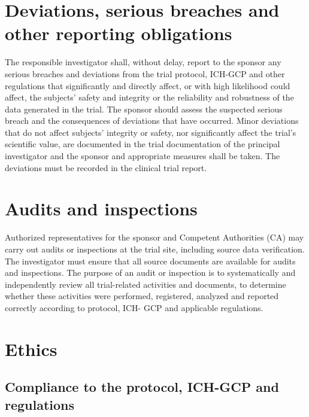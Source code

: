 \documentclass[
]{scrartcl}
\begin{document}
\hypertarget{deviations-serious-breaches-and-other-reporting-obligations}{%
\section{Deviations, serious breaches and other reporting
obligations}\label{deviations-serious-breaches-and-other-reporting-obligations}}

The responsible investigator shall, without delay, report to the sponsor
any serious breaches and deviations from the trial protocol, ICH-GCP and
other regulations that significantly and directly affect, or with high
likelihood could affect, the subjects' safety and integrity or the
reliability and robustness of the data generated in the trial. The
sponsor should assess the suspected serious breach and the consequences
of deviations that have occurred. Minor deviations that do not affect
subjects' integrity or safety, nor significantly affect the trial's
scientific value, are documented in the trial documentation of the
principal investigator and the sponsor and appropriate measures shall be
taken. The deviations must be recorded in the clinical trial report.

\hypertarget{audits-and-inspections}{%
\section{Audits and inspections}\label{audits-and-inspections}}

Authorized representatives for the sponsor and Competent Authorities
(CA) may carry out audits or inspections at the trial site, including
source data verification. The investigator must ensure that all source
documents are available for audits and inspections. The purpose of an
audit or inspection is to systematically and independently review all
trial-related activities and documents, to determine whether these
activities were performed, registered, analyzed and reported correctly
according to protocol, ICH- GCP and applicable regulations.

\hypertarget{ethics}{%
\section{Ethics}\label{ethics}}

\hypertarget{compliance-to-the-protocol-ich-gcp-and-regulations}{%
\subsection{Compliance to the protocol, ICH-GCP and
regulations}\label{compliance-to-the-protocol-ich-gcp-and-regulations}}
\end{document}
